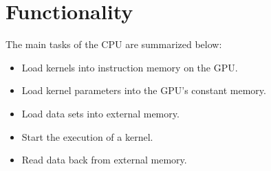 \documentclass[../main/report.tex]{subfiles}
\begin{document}
\section{Functionality}

The main tasks of the CPU are summarized below:

\begin{itemize}
  \item Load kernels into instruction memory on the GPU.
  \item Load kernel parameters into the GPU's constant memory.
  \item Load data sets into external memory.
  \item Start the execution of a kernel.
  \item Read data back from external memory.
\end{itemize}
\end{document}
